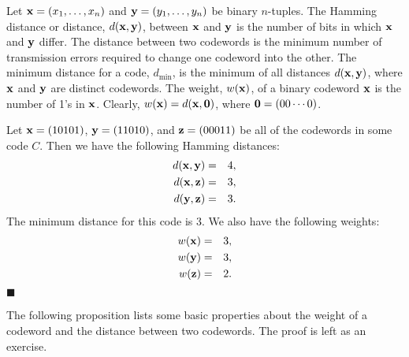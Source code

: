  
Let ${\bold x} = (x_1, \ldots, x_n)$ and ${\bold y} = (y_1, \ldots,
y_n)$ be binary $n$-tuples. The {\bfi Hamming distance\/} or {\bfi distance}, $d({\bold x}, {\bold
y})$\label{noteHammingdist}, between ${\bold x}$ and ${\bold y}$ is
the number of bits in which ${\bold x}$ and ${\bold y}$ differ. The
distance between two codewords is the minimum number of transmission
errors required to change one codeword into the other. The
{\bfi minimum distance\/} for a code,
$d_{\min}$\label{notemindist}, is the minimum of all distances
$d({\bold x}, {\bold y})$, where ${\bold x}$ and ${\bold y}$ are
distinct codewords. The {\bfi weight},
$w({\bold x})$\label{noteweight}, of a binary codeword ${\bold x}$ is
the number of 1's in ${\bold x}$. Clearly, $w({\bold x}) = d({\bold
x}, {\bold 0})$, where ${\bold 0} = (00 \cdots 0)$. 
 
 
\vspace{2ex}
 
 
Let ${\bold x} = (10101)$, ${\bold y} = (11010)$, and ${\bold z} =
(00011)$ be all of the codewords in some code $C$. Then we have the
following Hamming distances: 
\begin{eqnarray*}
d({\bold x},{\bold y}) & = & 4, \\
d({\bold x},{\bold z}) & = & 3, \\
d({\bold y},{\bold z}) & = & 3.
\end{eqnarray*}
The minimum distance  for this code is 3. We also have the
following weights: 
\begin{eqnarray*}
w({\bold x}) & = & 3, \\
w({\bold y}) & = & 3, \\
w({\bold z}) & = & 2.
\end{eqnarray*}
\hspace{\fill} $\blacksquare$
 
 
\vspace{2ex}
 
 
The following proposition lists some basic properties about the weight
of a codeword and the distance between two codewords. The proof is
left as an exercise.
 
